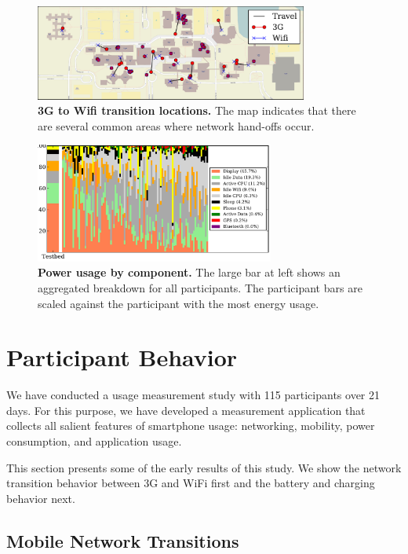 \begin{figure}[t]
\centering
\includegraphics[width=0.8\textwidth]{./figs/network-transitions.pdf}
\caption{\textbf{3G to Wifi transition locations.} The map indicates that
there are several common areas where network hand-offs occur.}
\label{figure-networktransitions}
\end{figure}

\begin{figure}[t]
\centering
\includegraphics[width=0.7\textwidth]{./figs/battery-breakdown.pdf}
\caption{\textbf{Power usage by component.} The large bar at left shows an
aggregated breakdown for all participants. The participant bars are scaled
against the participant with the most energy usage.}
\label{figure-batteryoverview}
\end{figure}

\section{Participant Behavior}
\label{sec-usage}

We have conducted a usage measurement study with 115 participants over 21 days.
For this purpose, we have developed a measurement application that collects all
salient features of smartphone usage: networking, mobility, power consumption,
and application usage.

This section presents some of the early results of this study. We show the
network transition behavior between 3G and WiFi first and the battery and
charging behavior next.

\subsection{Mobile Network Transitions}
\label{subsec-networktransitions}


